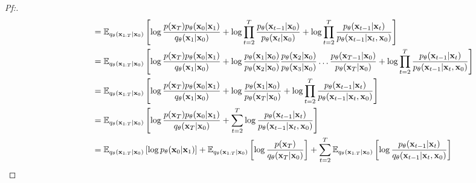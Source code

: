 \documentclass{article}
\begin{document}
\begin{proof}[\textit{Pf:}]
\begin{align}
        &\qquad\qquad\,\, = \mathbb{E}_{q_{\theta}(\mathbf{x}_{1:T}|\mathbf{x}_0)}\left[\log \frac{p(\mathbf{x}_T)p_{\theta}(\mathbf{x}_0|\mathbf{x}_1)}{q_{\theta}(\mathbf{x}_{1}|\mathbf{x}_{0})} + \log \prod_{t=2}^{T} \frac{p_{\theta}(\mathbf{x}_{t-1}|\mathbf{x}_0)}{p_{\theta}(\mathbf{x}_{t}|\mathbf{x}_0)} + \log \prod_{t=2}^{T} \frac{p_{\theta}(\mathbf{x}_{t-1}|\mathbf{x}_t)}{p_{\theta}(\mathbf{x}_{t-1}|\mathbf{x}_t,\mathbf{x}_0)} \right] \notag \\
        &\qquad\qquad\,\, = \mathbb{E}_{q_{\theta}(\mathbf{x}_{1:T}|\mathbf{x}_0)}\left[\log \frac{p(\mathbf{x}_T)p_{\theta}(\mathbf{x}_0|\mathbf{x}_1)}{q_{\theta}(\mathbf{x}_{1}|\mathbf{x}_{0})} 
        + \log \frac{p_{\theta}(\mathbf{x}_{1}|\mathbf{x}_0)}{p_{\theta}(\mathbf{x}_{2}|\mathbf{x}_0)} \frac{p_{\theta}(\mathbf{x}_{2}|\mathbf{x}_0)}{p_{\theta}(\mathbf{x}_{3}|\mathbf{x}_0)} \dots \frac{p_{\theta}(\mathbf{x}_{T-1}|\mathbf{x}_0)}{p_{\theta}(\mathbf{x}_{T}|\mathbf{x}_0)}
        + \log \prod_{t=2}^{T} \frac{p_{\theta}(\mathbf{x}_{t-1}|\mathbf{x}_t)}{p_{\theta}(\mathbf{x}_{t-1}|\mathbf{x}_t,\mathbf{x}_0)} \right] \notag \\
        &\qquad\qquad\,\, = \mathbb{E}_{q_{\theta}(\mathbf{x}_{1:T}|\mathbf{x}_0)}\left[\log \frac{p(\mathbf{x}_T)p_{\theta}(\mathbf{x}_0|\mathbf{x}_1)}{q_{\theta}(\mathbf{x}_{1}|\mathbf{x}_{0})} 
        + \log \frac{p_{\theta}(\mathbf{x}_{1}|\mathbf{x}_0)}{p_{\theta}(\mathbf{x}_{T}|\mathbf{x}_0)}
        + \log \prod_{t=2}^{T} \frac{p_{\theta}(\mathbf{x}_{t-1}|\mathbf{x}_t)}{p_{\theta}(\mathbf{x}_{t-1}|\mathbf{x}_t,\mathbf{x}_0)} \right] \notag \\
        &\qquad\qquad\,\, = \mathbb{E}_{q_{\theta}(\mathbf{x}_{1:T}|\mathbf{x}_0)}\left[\log \frac{p(\mathbf{x}_T)p_{\theta}(\mathbf{x}_0|\mathbf{x}_1)}{q_{\theta}(\mathbf{x}_{T}|\mathbf{x}_{0})} 
        + \sum_{t = 2}^{T} \log \frac{p_{\theta}(\mathbf{x}_{t-1}|\mathbf{x}_t)}{p_{\theta}(\mathbf{x}_{t-1}|\mathbf{x}_t,\mathbf{x}_0)} \right] \notag \\
        &\qquad\qquad\,\, = \mathbb{E}_{q_{\theta}(\mathbf{x}_{1:T}|\mathbf{x}_0)}\left[\log p_{\theta}(\mathbf{x}_0|\mathbf{x}_1) \right]
        + \mathbb{E}_{q_{\theta}(\mathbf{x}_{1:T}|\mathbf{x}_0)}\left[ \log \frac{p(\mathbf{x}_{T})}{q_{\theta}(\mathbf{x}_{T}|\mathbf{x}_0)} \right]
        + \sum_{t = 2}^{T} \mathbb{E}_{q_{\theta}(\mathbf{x}_{1:T}|\mathbf{x}_0)}\left[ \log \frac{p_{\theta}(\mathbf{x}_{t-1}|\mathbf{x}_t)}{q_{\theta}(\mathbf{x}_{t-1}|\mathbf{x}_t,\mathbf{x}_0)} \right] \notag \\

\end{align}
\end{proof}
\end{document}
